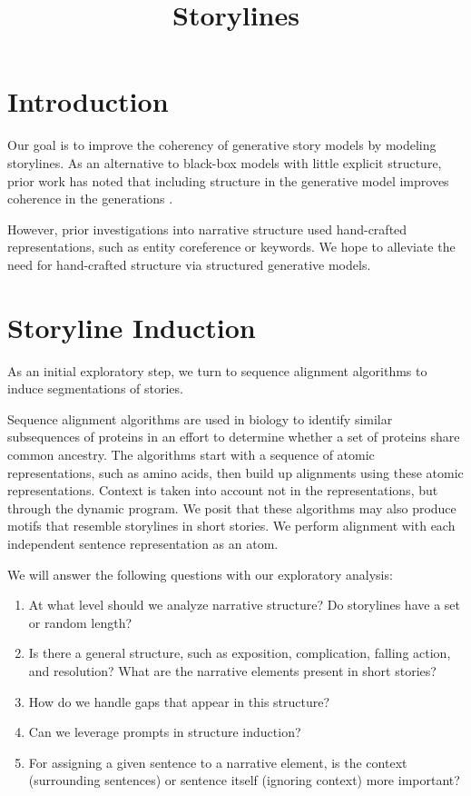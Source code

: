 \documentclass{article}
\title{Storylines}
\begin{document}
\maketitle

\section{Introduction}
Our goal is to improve the coherency of generative story models by modeling storylines.
As an alternative to black-box models with little explicit structure,
prior work has noted that including structure in the generative model improves coherence
in the generations \citep{yao2018storyline,fan2019structure}.

However, prior investigations into narrative structure used hand-crafted representations,
such as entity coreference or keywords.
We hope to alleviate the need for hand-crafted structure via structured generative models.

\section{Storyline Induction}
As an initial exploratory step,
we turn to sequence alignment algorithms to induce segmentations of stories.

Sequence alignment algorithms are used in biology to identify
similar subsequences of proteins in an effort to determine whether a set of
proteins share common ancestry.
The algorithms start with a sequence of atomic representations,
such as amino acids, then build up alignments using these atomic representations.
Context is taken into account not in the representations,
but through the dynamic program.
We posit that these algorithms may also produce motifs that
resemble storylines in short stories.
We perform alignment with each independent sentence representation as an atom.


We will answer the following questions with our exploratory analysis:
\begin{enumerate}
\item At what level should we analyze narrative structure?
    Do storylines have a set or random length?
\item Is there a general structure, such as exposition, complication, falling action, and resolution?
    What are the narrative elements present in short stories?
\item How do we handle gaps that appear in this structure?
\item Can we leverage prompts in structure induction?
\item For assigning a given sentence to a narrative element,
    is the context (surrounding sentences) or sentence itself (ignoring context)
    more important?
\end{enumerate}
\end{document}

